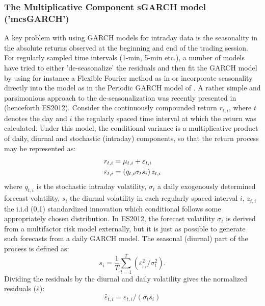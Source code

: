 \subsubsection{The Multiplicative Component sGARCH model ('mcsGARCH')}\label{section:mcsgarch}
A key problem with using GARCH models for intraday data is the seasonality in the absolute returns observed at the beginning and end of the trading session. For regularly sampled time intervals (1-min, 5-min etc.), a number of models have tried to either 'de-seasonalize' the residuals and then fit the GARCH model by using for instance a Flexible Fourier method as in \cite{Andersen1997} or incorporate seasonality directly into the model as in the Periodic GARCH model of \cite{Bollerslev1996a}. A rather simple and parsimonious approach to the de-seasonalization was recently presented in \cite{Engle2012} (henceforth ES2012). Consider the continuously compounded return $r_{t,i}$, where $t$ denotes the day and $i$ the regularly spaced time interval at which the return was calculated. Under this model, the conditional variance is a multiplicative product of daily, diurnal and stochastic (intraday) components, so that the return process may be represented as:
\begin{equation}\label{mcs1}
\begin{gathered}
  {r_{t,i}} = {\mu _{t,i}} + {\varepsilon _{t,i}} \hfill \\
  {\varepsilon _{t,i}} = \left( {{q_{t,i}}{\sigma _t}{s_i}} \right){z_{t,i}} \hfill \\
\end{gathered}
\end{equation}
where $q_{t,i}$ is the stochastic intraday volatility, $\sigma_t$ a daily exogenously determined forecast volatility, $s_i$ the diurnal volatility in each regularly spaced interval $i$, $z_{t,i}$ the i.i.d (0,1) standardized innovation which conditional follows some appropriately chosen distribution. In ES2012, the forecast volatility $\sigma_t$ is derived from a multifactor risk model externally, but it is just as possible to generate such forecasts from a daily GARCH model. The seasonal (diurnal) part of the process is defined as:
\begin{equation}\label{mcs2}
{s_i} = \frac{1}{T}\sum\limits_{t = 1}^T {\left( {\varepsilon _{_{t,i}}^2/\sigma _t^2} \right)}.
\end{equation}
Dividing the residuals by the diurnal and daily volatility gives the normalized residuals ($\bar \varepsilon$):
\begin{equation}\label{mcs3}
{{\bar \varepsilon }_{t,i}} = {\varepsilon _{t,i}}/\left( {{\sigma _t}{s_i}} \right)
\end{equation}
